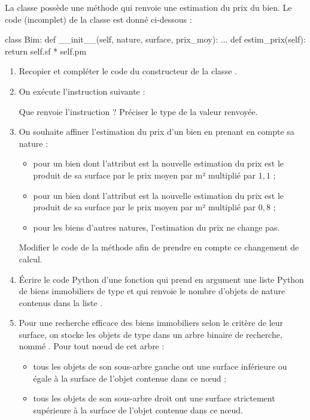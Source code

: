 \documentclass[11pt,a4paper,french,twoside]{PMCours}
\begin{document}
La classe  possède une méthode  qui renvoie une estimation du prix du
bien. Le code (incomplet) de la classe  est donné ci-dessous :
\begin{Python*}
class Bim:
    def __init__(self, nature, surface, prix_moy):
        ...
    def estim_prix(self):
        return self.sf * self.pm
\end{Python*}

\begin{enumerate}
\item Recopier et compléter le code du constructeur de la classe .
\item On exécute l'instruction suivante :

\medskip
{}

Que renvoie l'instruction  ? Préciser le type de la valeur renvoyée.
\item On souhaite affiner l'estimation du prix d'un bien en prenant en compte sa nature :
\begin{itemize}
\item pour un bien dont l'attribut  est  la nouvelle estimation du prix est le
produit de sa surface par le prix moyen par m² multiplié par $1,\!1$ ;
\item pour un bien dont l'attribut  est  la nouvelle estimation du prix est le
produit de sa surface par le prix moyen par m² multiplié par $0,\!8$ ;
\item pour les biens d'autres natures, l'estimation du prix ne change pas.
\end{itemize}
Modifier le code de la méthode  afin de prendre en compte ce changement
de calcul.
\item Écrire le code Python d'une fonction  qui prend en argument une liste
Python de biens immobiliers de type  et qui renvoie le nombre d'objets de nature
 contenus dans la liste .
\item Pour une recherche efficace des biens immobiliers selon le critère de leur surface, on
stocke les objets de type  dans un arbre binaire de recherche, nommé . Pour tout
nœud de cet arbre :
\begin{itemize}
\item tous les objets de son sous-arbre gauche ont une surface inférieure ou égale à la
surface de l'objet contenue dans ce nœud ;
\item tous les objets de son sous-arbre droit ont une surface strictement supérieure à la
surface de l'objet contenue dans ce nœud.
\end{itemize}


\end{enumerate}
\end{document}
